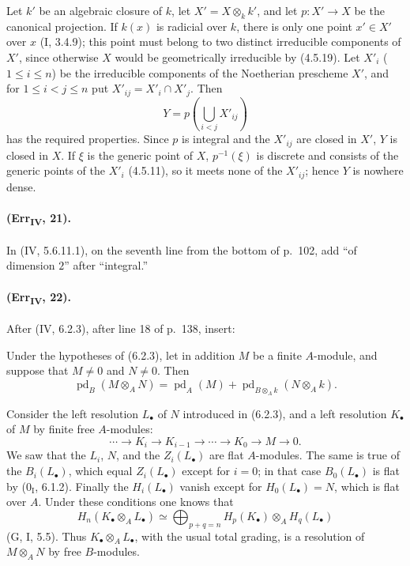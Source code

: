 Let $k'$ be an algebraic closure of $k$, let $X'=X\otimes_kk'$, and let
$p:X'\to X$ be the canonical projection.  If $k(x)$ is radicial over
$k$, there is only one point $x'\in X'$ over $x$ (I, 3.4.9); this point
must belong to two distinct irreducible components of $X'$, since
otherwise $X$ would be geometrically irreducible by (4.5.19).  Let
$X'_i$ ($1\leq i\leq n$) be the irreducible components of the Noetherian
prescheme $X'$, and for $1\leq i<j\leq n$ put
$X'_{ij}=X'_i\cap X'_j$.  Then
\[
 Y=p\left(\bigcup_{i<j}X'_{ij}\right)
\]
has the required properties.  Since $p$ is integral and the $X'_{ij}$
are closed in $X'$, $Y$ is closed in $X$.  If $\xi$ is the generic point
of $X$, $p^{-1}(\xi)$ is discrete and consists of the generic points of
the $X'_i$ (4.5.11), so it meets none of the $X'_{ij}$; hence $Y$ is
nowhere dense.

\paragraph{(Err\textsubscript{IV}, 21).}
In (IV, 5.6.11.1), on the seventh line from the bottom of p.~102, add
``of dimension $2$'' after ``integral.''

\paragraph{(Err\textsubscript{IV}, 22).}
After (IV, 6.2.3), after line 18 of p.~138, insert:

\begin{proposition}[6.2.4]
Under the hypotheses of (6.2.3), let in addition $M$ be a finite
$A$-module, and suppose that $M\neq0$ and $N\neq0$.  Then
\begin{equation}
 \operatorname{pd}_B(M\otimes_AN)=
 \operatorname{pd}_A(M)+
 \operatorname{pd}_{B\otimes_Ak}(N\otimes_Ak). \tag{6.2.4.1}
\end{equation}
\end{proposition}

Consider the left resolution $L_\bullet$ of $N$ introduced in (6.2.3),
and a left resolution $K_\bullet$ of $M$ by finite free $A$-modules:
\[
 \cdots\longrightarrow K_i\longrightarrow K_{i-1}\longrightarrow
 \cdots\longrightarrow K_0\longrightarrow M\longrightarrow0.
\]
We saw that the $L_i$, $N$, and the $Z_i(L_\bullet)$ are flat
$A$-modules.  The same is true of the $B_i(L_\bullet)$, which equal
$Z_i(L_\bullet)$ except for $i=0$; in that case $B_0(L_\bullet)$ is flat
by ($0_{\mathrm I}$, 6.1.2).  Finally the $H_i(L_\bullet)$ vanish except
for $H_0(L_\bullet)=N$, which is flat over $A$.  Under these conditions
one knows that
\[
 H_n(K_\bullet\otimes_AL_\bullet)\simeq
 \bigoplus_{p+q=n}H_p(K_\bullet)\otimes_AH_q(L_\bullet)
\]
(G, I, 5.5).  Thus $K_\bullet\otimes_AL_\bullet$, with the usual total
grading, is a resolution of $M\otimes_AN$ by free $B$-modules.

